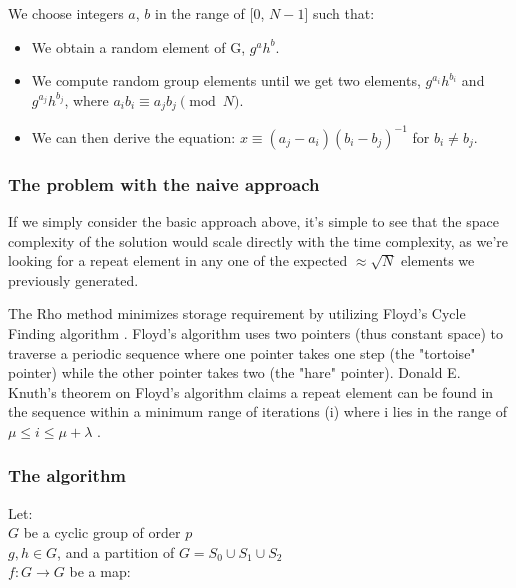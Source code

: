 \documentclass{article}
\begin{document}
      We choose integers $a$, $b$ in the range of [$0$, $N - 1$] such that:

      \begin{itemize}

        \item We obtain a random element of G, $g^ah^b$.

        \item We compute random group elements until we get two elements, $g^{a_i}h^{b_i}$ and $g^{a_j}h^{b_j}$, where $a_ib_i \equiv a_jb_j \pmod{N}$.

        \item We can then derive the equation: $x \equiv (a_j - a_i)(b_i - b_j)^{-1}$ for $b_i \neq b_j$.

      \end{itemize}

      \subsubsection{The problem with the naive approach}

      If we simply consider the basic approach above, it's simple to see that the space complexity of the solution would scale directly with the time complexity, as we're looking for a repeat element in any one of the expected $\approx\sqrt{N}$ elements we previously generated.

      The Rho method minimizes storage requirement by utilizing Floyd's Cycle Finding algorithm \autocite{BaiBrent2008}.  Floyd's algorithm uses two pointers (thus constant space) to traverse a periodic sequence where one pointer takes one step (the "tortoise" pointer) while the other pointer takes two (the "hare" pointer).  Donald E. Knuth's theorem on Floyd's algorithm claims a repeat element can be found in the sequence within a minimum range of iterations (i) where i lies in the range of $\mu \leq i \leq \mu + \lambda$ \autocite{BaiBrent2008}. \\

      \subsubsection{The algorithm}

      Let: \\
      $G$ be a cyclic group of order $p$ \\
      $g, h \in G$, and a partition of $G = S_0 \cup S_1 \cup S_2$ \\
      $f: G \to G$ be a map: \\
\end{document}
